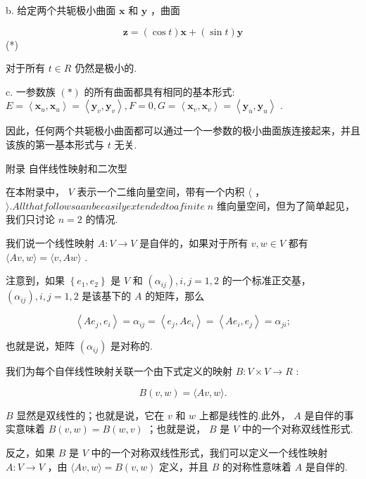 b. 给定两个共轭极小曲面 \(\mathbf{x}\) 和 \(\mathbf{y}\) ，曲面

\[
\mathbf{z} = \left( {\cos t}\right) \mathbf{x} + \left( {\sin t}\right) \mathbf{y}
\]
 (*)

对于所有 \(t \in  R\) 仍然是极小的.

c. 一参数族 \(\left( *\right)\) 的所有曲面都具有相同的基本形式: \(E = \left\langle  {{\mathbf{x}}_{u},{\mathbf{x}}_{u}}\right\rangle   = \left\langle  {{\mathbf{y}}_{v},{\mathbf{y}}_{v}}\right\rangle  ,F = 0,G = \left\langle  {{\mathbf{x}}_{v},{\mathbf{x}}_{v}}\right\rangle   = \left\langle  {{\mathbf{y}}_{u},{\mathbf{y}}_{u}}\right\rangle\) .

因此，任何两个共轭极小曲面都可以通过一个一参数的极小曲面族连接起来，并且该族的第一基本形式与 \(t\) 无关.

附录 自伴线性映射和二次型

在本附录中， \(V\) 表示一个二维向量空间，带有一个内积 \(\langle\) ， \(\rangle {.Allthatfollowsaanbeeasilyextendedtoafinite} \; n\) 维向量空间，但为了简单起见，我们只讨论 \(n = 2\) 的情况.

我们说一个线性映射 \(A : V \rightarrow  V\) 是自伴的，如果对于所有 \(v,w \in  V\) 都有 \(\langle {Av},w\rangle  = \langle v,{Aw}\rangle\) .

注意到，如果 \(\left\{  {{e}_{1},{e}_{2}}\right\}\) 是 \(V\) 和 \(\left( {\alpha }_{ij}\right) ,i,j = 1,2\) 的一个标准正交基， \(\left( {\alpha }_{ij}\right) ,i,j = 1,2\) 是该基下的 \(A\) 的矩阵，那么

\[
\left\langle  {A{e}_{j},{e}_{i}}\right\rangle   = {\alpha }_{ij} = \left\langle  {{e}_{j},A{e}_{i}}\right\rangle   = \left\langle  {A{e}_{i},{e}_{j}}\right\rangle   = {\alpha }_{ji};
\]

也就是说，矩阵 \(\left( {\alpha }_{ij}\right)\) 是对称的.

我们为每个自伴线性映射关联一个由下式定义的映射 \(B : V \times  V \rightarrow  R\) :

\[
B\left( {v,w}\right)  = \langle {Av},w\rangle .
\]

\(B\) 显然是双线性的；也就是说，它在 \(v\) 和 \(w\) 上都是线性的.此外， \(A\) 是自伴的事实意味着 \(B\left( {v,w}\right)  = B\left( {w,v}\right)\) ；也就是说， \(B\) 是 \(V\) 中的一个对称双线性形式.

反之，如果 \(B\) 是 \(V\) 中的一个对称双线性形式，我们可以定义一个线性映射 \(A : V \rightarrow  V\) ，由 \(\langle {Av},w\rangle  = B\left( {v,w}\right)\) 定义，并且 \(B\) 的对称性意味着 \(A\) 是自伴的.


